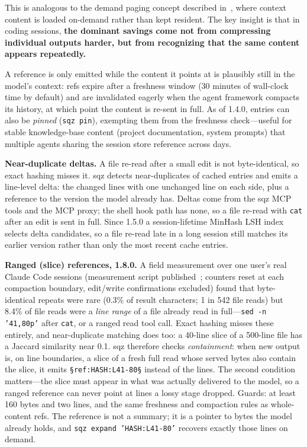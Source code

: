 \documentclass[10pt,twocolumn]{article}
\begin{document}
This is analogous to the demand paging concept described in~\cite{demandpaging2025}, where context content is loaded on-demand rather than kept resident. The key insight is that in coding sessions, \textbf{the dominant savings come not from compressing individual outputs harder, but from recognizing that the same content appears repeatedly.}

A reference is only emitted while the content it points at is plausibly still in the model's context: refs expire after a freshness window (30 minutes of wall-clock time by default) and are invalidated eagerly when the agent framework compacts its history, at which point the content is re-sent in full. As of 1.4.0, entries can also be \emph{pinned} (\texttt{sqz pin}), exempting them from the freshness check---useful for stable knowledge-base content (project documentation, system prompts) that multiple agents sharing the session store reference across days.

\textbf{Near-duplicate deltas.} A file re-read after a small edit is not byte-identical, so exact hashing misses it. sqz detects near-duplicates of cached entries and emits a line-level delta: the changed lines with one unchanged line on each side, plus a reference to the version the model already has. Deltas come from the sqz MCP tools and the MCP proxy; the shell hook path has none, so a file re-read with \texttt{cat} after an edit is sent in full. Since 1.5.0 a session-lifetime MinHash LSH index selects delta candidates, so a file re-read late in a long session still matches its earlier version rather than only the most recent cache entries.

\textbf{Ranged (slice) references, 1.8.0.} A field measurement over one user's real Claude Code sessions (measurement script published~\cite{harrison2026repeats}; counters reset at each compaction boundary, edit/write confirmations excluded) found that byte-identical repeats were rare (0.3\% of result characters; 1 in 542 file reads) but 8.4\% of file reads were a \emph{line range} of a file already read in full---\texttt{sed -n '41,80p'} after \texttt{cat}, or a ranged read tool call. Exact hashing misses these entirely, and near-duplicate matching does too: a 40-line slice of a 500-line file has a Jaccard similarity near 0.1. sqz therefore checks \emph{containment}: when new output is, on line boundaries, a slice of a fresh full read whose served bytes also contain the slice, it emits \texttt{\S ref:HASH:L41-80\S} instead of the lines. The second condition matters---the slice must appear in what was actually delivered to the model, so a ranged reference can never point at lines a lossy stage dropped. Guards: at least 160 bytes and two lines, and the same freshness and compaction rules as whole-content refs. The reference is not a summary; it is a pointer to bytes the model already holds, and \texttt{sqz expand 'HASH:L41-80'} recovers exactly those lines on demand.
\end{document}

